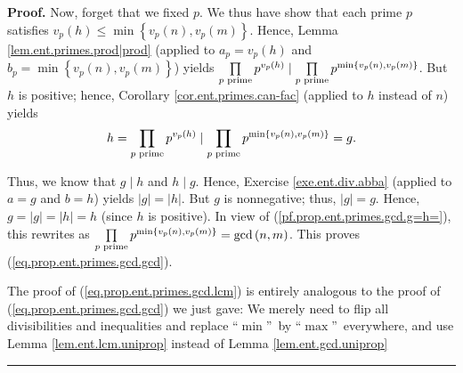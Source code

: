 \documentclass[numbers=enddot,12pt,final,onecolumn,notitlepage]{scrartcl}%
\numberwithin{exer}{subsection}
\theoremstyle{definition}
\newenvironment{proof}[1][Proof]{\noindent\textbf{#1.} }{\ \rule{0.5em}{0.5em}}
\let\prodnonlimits\prod
\renewcommand{\prod}{\prodnonlimits\limits}
\begin{document}
\begin{proof}
Now, forget that we fixed $p$. We thus have show that each prime $p$ satisfies
$v_{p}\left(  h\right)  \leq\min\left\{  v_{p}\left(  n\right)  ,v_{p}\left(
m\right)  \right\}  $. Hence, Lemma \ref{lem.ent.primes.prod|prod} (applied to
$a_{p}=v_{p}\left(  h\right)  $ and $b_{p}=\min\left\{  v_{p}\left(  n\right)
,v_{p}\left(  m\right)  \right\}  $) yields $\prod\limits_{p\text{ prime}%
}p^{v_{p}\left(  h\right)  }\mid\prod\limits_{p\text{ prime}}p^{\min\left\{
v_{p}\left(  n\right)  ,v_{p}\left(  m\right)  \right\}  }$. But $h$ is
positive; hence, Corollary \ref{cor.ent.primes.can-fac} (applied to $h$
instead of $n$) yields%
\[
h=\prod\limits_{p\text{ prime}}p^{v_{p}\left(  h\right)  }\mid\prod
\limits_{p\text{ prime}}p^{\min\left\{  v_{p}\left(  n\right)  ,v_{p}\left(
m\right)  \right\}  }=g.
\]


Thus, we know that $g\mid h$ and $h\mid g$. Hence, Exercise
\ref{exe.ent.div.abba} (applied to $a=g$ and $b=h$) yields $\left\vert
g\right\vert =\left\vert h\right\vert $. But $g$ is nonnegative; thus,
$\left\vert g\right\vert =g$. Hence, $g=\left\vert g\right\vert =\left\vert
h\right\vert =h$ (since $h$ is positive). In view of
(\ref{pf.prop.ent.primes.gcd.g=h=}), this rewrites as $\prod\limits_{p\text{
prime}}p^{\min\left\{  v_{p}\left(  n\right)  ,v_{p}\left(  m\right)
\right\}  }=\gcd\left(  n,m\right)  $. This proves
(\ref{eq.prop.ent.primes.gcd.gcd}).

The proof of (\ref{eq.prop.ent.primes.gcd.lcm}) is entirely analogous to the
proof of (\ref{eq.prop.ent.primes.gcd.gcd}) we just gave: We merely need to
flip all divisibilities and inequalities and replace \textquotedblleft$\min
$\textquotedblright\ by \textquotedblleft$\max$\textquotedblright\ everywhere,
and use Lemma \ref{lem.ent.lcm.uniprop} instead of Lemma
\ref{lem.ent.gcd.uniprop}
\end{proof}
\end{document}
